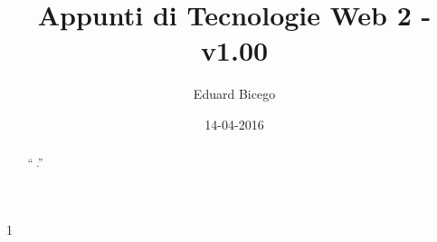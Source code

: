 \documentclass[a4paper,11pt]{report}
\begin{document}
\title{Appunti di Tecnologie Web 2 - v1.00}
\author{Eduard Bicego}
\date{14-04-2016}

\maketitle



\begin{abstract}
	`` .''
\end{abstract}
\hypersetup{linkcolor=black}
\tableofcontents
\listoffigures

\hypersetup{linkcolor=blue, urlcolor=blue}


























\begin{appendices}





%

%

%

%

%

\end{appendices}


1
\end{document}
